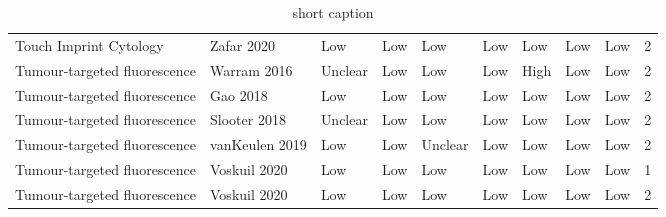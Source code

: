 \begin{table}[ht]
\begin{tabular}{llllllllll}
  Touch Imprint Cytology & Zafar 2020 & Low & Low & Low & Low & Low & Low & Low & 2 \\ 
  Tumour-targeted fluorescence & Warram 2016 & Unclear & Low & Low & Low & High & Low & Low & 2 \\ 
  Tumour-targeted fluorescence & Gao 2018 & Low & Low & Low & Low & Low & Low & Low & 2 \\ 
  Tumour-targeted fluorescence & Slooter 2018 & Unclear & Low & Low & Low & Low & Low & Low & 2 \\ 
  Tumour-targeted fluorescence & vanKeulen 2019 & Low & Low & Unclear & Low & Low & Low & Low & 2 \\ 
  Tumour-targeted fluorescence & Voskuil 2020 & Low & Low & Low & Low & Low & Low & Low & 1 \\ 
  Tumour-targeted fluorescence & Voskuil 2020 & Low & Low & Low & Low & Low & Low & Low & 2 \\ 
   \hline
\end{tabular}
\endgroup
\caption[full caption]{short caption} 
\label{tab:qual_scores}
\end{table}
